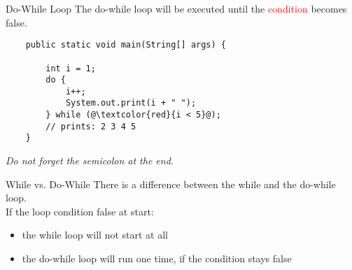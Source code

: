 \begin{frame}[fragile]{Do-While Loop}
	The do-while loop will be executed until the \textcolor{red}{condition} becomes false.
	\begin{lstlisting}
	public static void main(String[] args) {
	
	    int i = 1;
	    do {
	        i++;
	        System.out.print(i + " ");
	    } while (@\textcolor{red}{i < 5}@);
	    // prints: 2 3 4 5
	}
	\end{lstlisting}
	\emph{Do not forget the semicolon at the end.}
\end{frame}

\begin{frame}{While vs. Do-While}
	There is a difference between the while and the do-while loop. \\
	\vfill
	If the loop condition false at start:
	\begin{itemize}
		\item the while loop will not start at all
		\item the do-while loop will run one time, if the condition stays false
	\end{itemize}
\end{frame}

